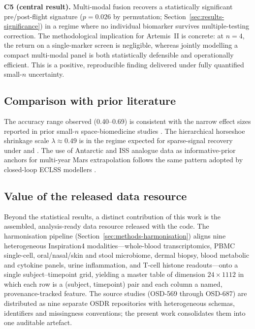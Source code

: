 \documentclass[11pt,a4paper,3p,authoryear]{elsarticle}
\begin{document}
\textbf{C5 (central result).} Multi-modal fusion recovers a statistically significant pre/post-flight signature ($p=0.026$ by permutation; Section~\ref{sec:results-significance}) in a regime where no individual biomarker survives multiple-testing correction. The methodological implication for Artemis~II is concrete: at $n=4$, the return on a single-marker screen is negligible, whereas jointly modelling a compact multi-modal panel is both statistically defensible and operationally efficient. This is a positive, reproducible finding delivered under fully quantified small-$n$ uncertainty.

\subsection{Comparison with prior literature}

The accuracy range observed (0.40--0.69) is consistent with the narrow effect sizes reported in prior small-$n$ space-biomedicine studies \citep{GarrettBakelman2019twins,Voorhies2019iss,Crucian2018cortisol}. The hierarchical horseshoe shrinkage scale $\lambda \approx 0.49$ is in the regime expected for sparse-signal recovery under \citet{Carvalho2010horseshoe} and \citet{Piironen2017regularised}. The use of Antarctic and ISS analogue data \citep{Kuipers2020antarctic,Edgell2019iss} as informative-prior anchors for multi-year Mars extrapolation follows the same pattern adopted by closed-loop ECLSS modellers \citep{Bell2017biosimlib}.

\subsection{Value of the released data resource}\label{sec:discussion-datavalue}

Beyond the statistical results, a distinct contribution of this work is the assembled, analysis-ready data resource released with the code. The harmonisation pipeline (Section~\ref{sec:methods-harmonisation}) aligns nine heterogeneous Inspiration4 modalities---whole-blood transcriptomics, PBMC single-cell, oral/nasal/skin and stool microbiome, dermal biopsy, blood metabolic and cytokine panels, urine inflammation, and T-cell histone readouts---onto a single subject--timepoint grid, yielding a master table of dimension $24 \times 1112$ in which each row is a (subject, timepoint) pair and each column a named, provenance-tracked feature. The source studies (\mbox{OSD-569} through \mbox{OSD-687}) are distributed as nine separate OSDR repositories with heterogeneous schemas, identifiers and missingness conventions; the present work consolidates them into one auditable artefact.
\end{document}
